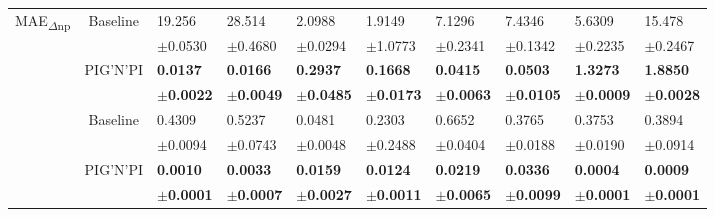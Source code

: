 \documentclass{article}
\newcommand{\pignpi}{PIG'N'PI\xspace}
\begin{document}
\begin{table}[H]
{\begin{tabularx}{\textwidth}{ccXXXXXXXX}
        \multirow{4}{*}{\textsf{MAE\textsubscript{$\Delta$np}}}
        & \multirow{2}{*}{Baseline} 
        & 19.256 & 28.514 & 2.0988 & 1.9149 & 7.1296 & 7.4346 & 5.6309 & 15.478\\
        &&\scriptsize$\pm$0.0530 & \scriptsize $\pm$0.4680 & \scriptsize $\pm$0.0294 & \scriptsize $\pm$1.0773 & \scriptsize $\pm$0.2341 & \scriptsize $\pm$0.1342 & \scriptsize $\pm$0.2235 & \scriptsize $\pm$0.2467\\
        \cline{3-10}\rule{0pt}{2.3ex}

        & \multirow{2}{*}{\pignpi}
        & \textbf{0.0137} & \textbf{0.0166} & \textbf{0.2937} & \textbf{0.1668} & \textbf{0.0415} & \textbf{0.0503} & \textbf{1.3273} & \textbf{1.8850}\\
        && \scriptsize \textbf{$\pm$0.0022} & \scriptsize \textbf{$\pm$0.0049} & \scriptsize \textbf{$\pm$0.0485} & \scriptsize \textbf{$\pm$0.0173} & \scriptsize \textbf{$\pm$0.0063} & \scriptsize \textbf{$\pm$0.0105} & \scriptsize \textbf{$\pm$0.0009} & \scriptsize \textbf{$\pm$0.0028}\\
    \hline\rule{0pt}{2.3ex}
        
        \multirow{4}{*}{$\textsf{MAE}_\textsf{symm}^{P}$}
        & \multirow{2}{*}{Baseline} 
        & 0.4309 & 0.5237 & 0.0481 & 0.2303 & 0.6652 & 0.3765 & 0.3753 & 0.3894\\
        &&\scriptsize$\pm$0.0094 & \scriptsize $\pm$0.0743 & \scriptsize $\pm$0.0048 & \scriptsize $\pm$0.2488 & \scriptsize $\pm$0.0404 & \scriptsize $\pm$0.0188 & \scriptsize $\pm$0.0190 & \scriptsize $\pm$0.0914\\
        \cline{3-10}\rule{0pt}{2.3ex}

        & \multirow{2}{*}{\pignpi}
        & \textbf{0.0010} & \textbf{0.0033} & \textbf{0.0159} & \textbf{0.0124} & \textbf{0.0219} & \textbf{0.0336} & \textbf{0.0004} & \textbf{0.0009}\\
        && \scriptsize \textbf{$\pm$0.0001} & \scriptsize \textbf{$\pm$0.0007} & \scriptsize \textbf{$\pm$0.0027} & \scriptsize \textbf{$\pm$0.0011} & \scriptsize \textbf{$\pm$0.0065} & \scriptsize \textbf{$\pm$0.0099} & \scriptsize \textbf{$\pm$0.0001} & \scriptsize \textbf{$\pm$0.0001}\\
        
      \bottomrule
\end{tabularx}
}
\end{table}


\clearpage
\end{document}
